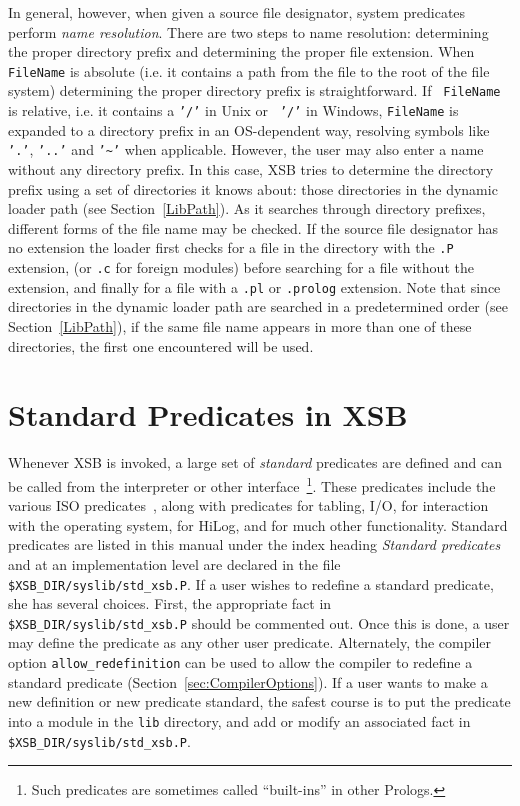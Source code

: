 In general, however, when given a source file designator, system
predicates perform {\em name resolution}.  There are two steps to name
resolution: determining the proper directory prefix and determining
the proper file extension.  When {\tt FileName} is absolute (i.e. it
contains a path from the file to the root of the file system)
determining the proper directory prefix is straightforward.  If {\tt
  FileName} is relative, i.e. it contains a {\tt '/'} in Unix or {\tt
  '/'} in Windows, {\tt FileName} is expanded to a directory prefix in
an OS-dependent way, resolving symbols like {\tt '.'}, {\tt '..'} and
{\tt '\~{}'} when applicable.  However, the user may also enter a name
without any directory prefix. In this case, XSB tries to determine the
directory prefix using a set of directories it knows about: those
directories in the dynamic loader path (see Section~\ref{LibPath}).
As it searches through directory prefixes, different forms of the file
name may be checked.  If the source file designator has no extension
the loader first checks for a file in the directory with the {\tt .P}
extension, (or {\tt .c} for foreign modules) before searching for a
file without the extension, and finally for a file with a {\tt .pl} or {\tt .prolog}
extension.  Note that since directories in the dynamic loader path are
searched in a predetermined order (see Section~\ref{LibPath}), if the
same file name appears in more than one of these directories, the
first one encountered will be used.

 


\section{Standard Predicates in XSB} \label{sec:standard}

Whenever XSB is invoked, a large set of {\em standard} predicates are
defined and can be called from the interpreter or other
interface~\footnote{Such predicates are sometimes called ``built-ins''
  in other Prologs.}.  These predicates include the various ISO
predicates~\cite{ISO-Prolog}, along with predicates for tabling, I/O,
for interaction with the operating system, for HiLog, and for much
other functionality.  Standard predicates are listed in this manual
under the index heading {\em Standard predicates} and at an
implementation level are declared in the file {\tt
  \$XSB\_DIR/syslib/std\_xsb.P}.  If a user wishes to redefine a
standard predicate, she has several choices.  First, the appropriate
fact in {\tt \$XSB\_DIR/syslib/std\_xsb.P} should be commented out.
Once this is done, a user may define the predicate as any other user
predicate.  Alternately, the compiler option {\tt allow\_redefinition}
can be used to allow the compiler to redefine a standard predicate
(Section~\ref{sec:CompilerOptions}).  If a user wants to make a new
definition or new predicate standard, the safest course is to put the
predicate into a module in the {\tt lib} directory, and add or modify
an associated fact in {\tt \$XSB\_DIR/syslib/std\_xsb.P}.

